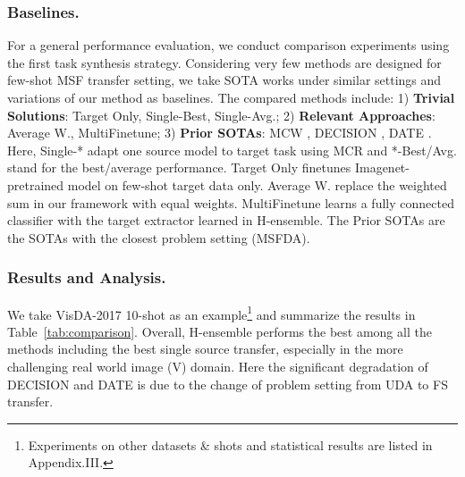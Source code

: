 \documentclass[letterpaper]{article} %
\begin{document}
\subsubsection{Baselines.}
For a general performance evaluation, we conduct comparison experiments using the first task synthesis strategy. Considering very few methods are designed for few-shot MSF transfer setting, we take SOTA works under similar settings and variations of our method as baselines. The compared methods include: 1) \textbf{Trivial Solutions}: Target Only, Single-Best, Single-Avg.; 2) \textbf{Relevant Approaches}: Average W., MultiFinetune; 3) \textbf{Prior SOTAs}: MCW \citep{lee2019learning}, DECISION \citep{ahmed2021unsupervised}, DATE \citep{han2023discriminability}.
Here, 
Single-* adapt one source model to target task using MCR and *-Best/Avg. stand for the best/average performance. Target Only finetunes Imagenet-pretrained model on few-shot target data only.
Average W. replace the weighted sum in our framework with
equal weights. MultiFinetune learns a fully connected classifier with the target extractor learned in H-ensemble.
The Prior SOTAs are the SOTAs with the closest problem setting (MSFDA). 





\subsubsection{Results and Analysis.}

We take VisDA-2017 10-shot as an example\footnote{Experiments on other datasets \& shots and statistical results are listed in Appendix.III.} and summarize the results in Table~\ref{tab:comparison}. Overall,  H-ensemble performs the best among all the methods including the best single source transfer, especially in the more challenging real world image (V) domain. Here the significant degradation of DECISION and DATE is due to the change of problem setting from UDA to FS transfer. 
\end{document}

